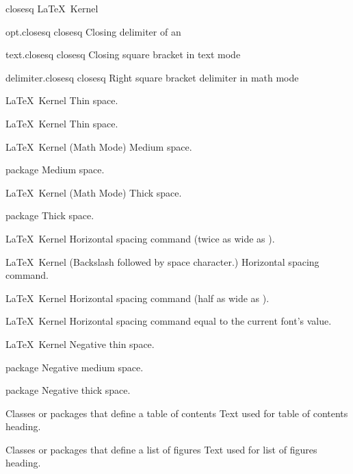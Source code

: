  {closesq}
 {\closesqsym}
 {}
 {\LaTeX\ Kernel}
 {\nopostdesc}
 {}

 {opt.closesq}
 {closesq}
 {\closesqsym}
 {Closing delimiter of an }

 {text.closesq}
 {closesq}
 {\closesqsym}
 {Closing square bracket in text mode}

 {delimiter.closesq}
 {closesq}
 {\closesqsym}
 {Right square bracket delimiter in math mode}

%
 {}%
 {\LaTeX\ Kernel}%
 {Thin space.}%
 {}

%
 {}%
 {\LaTeX\ Kernel}%
 {Thin space.}%
 {}

%
 {}%
 {\LaTeX\ Kernel (Math Mode)}%
 {Medium space.}%
 {}

%
 {}%
 { package}%
 {Medium space.}%
 {}

%
 {}%
 {\LaTeX\ Kernel (Math Mode)}%
 {Thick space.}%
 {}

%
 {}%
 { package}%
 {Thick space.}%
 {}

%
 {}%
 {\LaTeX\ Kernel}%
 {Horizontal spacing command (twice as wide as ).}%
 {}

%
 {}%
 {\LaTeX\ Kernel}%
 {(Backslash followed by space character.) Horizontal spacing command.}%
 {}

%
 {}%
 {\LaTeX\ Kernel}%
 {Horizontal spacing command (half as wide as ).}%
 {}

%
 {}%
 {\LaTeX\ Kernel}%
 {Horizontal spacing command equal to the current font's \protect{} value.}%
 {}

%
 {}%
 {\LaTeX\ Kernel}%
 {Negative thin space.}%
 {}

%
 {}%
 { package}%
 {Negative medium space.}%
 {}

%
 {}%
 { package}%
 {Negative thick space.}%
 {}

%
 {}%
 {Classes or packages that define a table of contents}%
 {Text used for table of contents heading.}%
 {}

%
 {}%
 {Classes or packages that define a list of figures}%
 {Text used for list of figures heading.}%
 {}

